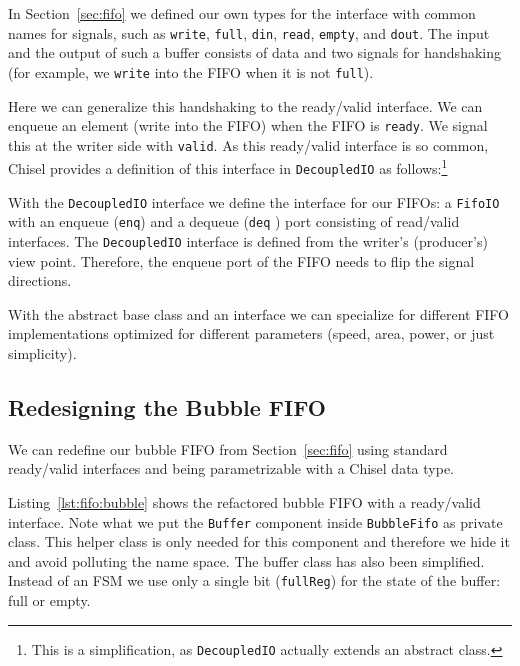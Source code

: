 \documentclass[%
    10pt,
    headinclude, footexclude,
    openright, %
    notitlepage,
    cleardoubleempty,
    headsepline,
    pointlessnumbers,
    bibtotoc, idxtotoc,
    ]{scrbook}
\newcommand{\code}[1]{{\lstinline[basicstyle=\small\ttfamily]{#1}}}
\newcommand{\codefoot}[1]{{\lstinline[basicstyle=\footnotesize\ttfamily]{#1}}}
\begin{document}

In Section~\ref{sec:fifo} we defined our own types for the interface with common
names for signals, such as \code{write}, \code{full}, \code{din}, \code{read},
\code{empty}, and \code{dout}. The input and the output of such a buffer consists
of data and two signals for handshaking (for example, we \code{write} into the FIFO when
it is not \code{full}).

Here we can generalize this handshaking to the ready/valid interface.
We can enqueue an element (write into the FIFO) when the FIFO is \code{ready}.
We signal this at the writer side with \code{valid}.
As this ready/valid interface is so common, Chisel provides a definition
of this interface in \code{DecoupledIO} as follows:\footnote{This is a simplification,
as \codefoot{DecoupledIO} actually extends an abstract class.}


\noindent With the \code{DecoupledIO} interface we define the interface for our FIFOs:
a \code{FifoIO} with an enqueue (\code{enq}) and a dequeue (\code{deq} ) port consisting
of read/valid interfaces.
 The \code{DecoupledIO} interface is defined from the writer's (producer's) view point.
Therefore, the enqueue port of the FIFO needs to flip the signal directions.



With the abstract base class and an interface we can specialize for different
FIFO implementations optimized for different parameters (speed, area, power,
or just simplicity).

\subsection{Redesigning the Bubble FIFO}

We can redefine our bubble FIFO from Section~\ref{sec:fifo} using standard
ready/valid interfaces and being parametrizable with a Chisel data type.


Listing~\ref{lst:fifo:bubble} shows the refactored bubble FIFO with a ready/valid
interface. Note what we put the \code{Buffer} component inside \code{BubbleFifo}
as private class. This helper class is only needed for this component and therefore
we hide it and avoid polluting the name space. The buffer class has also been
simplified. Instead of an FSM we use only a single bit (\code{fullReg}) for
the state of the buffer: full or empty.
\end{document}

